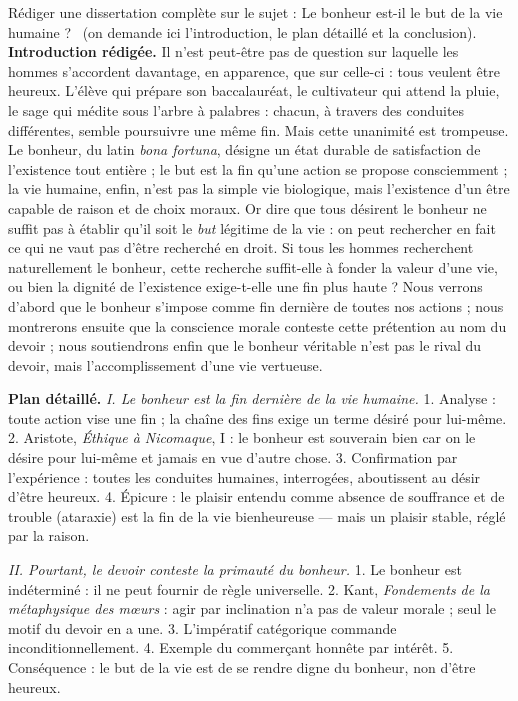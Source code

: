 \documentclass[11pt]{article}
\begin{document}
\begin{exoresolu}
Rédiger une dissertation complète sur le sujet : \guillemotleft Le bonheur est-il le but de la vie humaine ? \guillemotright\ (on demande ici l'introduction, le plan détaillé et la conclusion).
\tcblower
\textbf{Introduction rédigée.} Il n'est peut-être pas de question sur laquelle les hommes s'accordent davantage, en apparence, que sur celle-ci : tous veulent être heureux. L'élève qui prépare son baccalauréat, le cultivateur qui attend la pluie, le sage qui médite sous l'arbre à palabres : chacun, à travers des conduites différentes, semble poursuivre une même fin. Mais cette unanimité est trompeuse. Le bonheur, du latin \emph{bona fortuna}, désigne un état durable de satisfaction de l'existence tout entière ; le but est la fin qu'une action se propose consciemment ; la vie humaine, enfin, n'est pas la simple vie biologique, mais l'existence d'un être capable de raison et de choix moraux. Or dire que tous désirent le bonheur ne suffit pas à établir qu'il soit le \emph{but} légitime de la vie : on peut rechercher en fait ce qui ne vaut pas d'être recherché en droit. Si tous les hommes recherchent naturellement le bonheur, cette recherche suffit-elle à fonder la valeur d'une vie, ou bien la dignité de l'existence exige-t-elle une fin plus haute ? Nous verrons d'abord que le bonheur s'impose comme fin dernière de toutes nos actions ; nous montrerons ensuite que la conscience morale conteste cette prétention au nom du devoir ; nous soutiendrons enfin que le bonheur véritable n'est pas le rival du devoir, mais l'accomplissement d'une vie vertueuse.

\textbf{Plan détaillé.}
\emph{I. Le bonheur est la fin dernière de la vie humaine.}
1. Analyse : toute action vise une fin ; la chaîne des fins exige un terme désiré pour lui-même. 2. Aristote, \emph{Éthique à Nicomaque}, I : le bonheur est souverain bien car on le désire pour lui-même et jamais en vue d'autre chose. 3. Confirmation par l'expérience : toutes les conduites humaines, interrogées, aboutissent au désir d'être heureux. 4. Épicure : le plaisir entendu comme absence de souffrance et de trouble (ataraxie) est la fin de la vie bienheureuse — mais un plaisir stable, réglé par la raison.

\emph{II. Pourtant, le devoir conteste la primauté du bonheur.}
1. Le bonheur est indéterminé : il ne peut fournir de règle universelle. 2. Kant, \emph{Fondements de la métaphysique des mœurs} : agir par inclination n'a pas de valeur morale ; seul le motif du devoir en a une. 3. L'impératif catégorique commande inconditionnellement. 4. Exemple du commerçant honnête par intérêt. 5. Conséquence : le but de la vie est de se rendre digne du bonheur, non d'être heureux.


\end{exoresolu}
\end{document}
